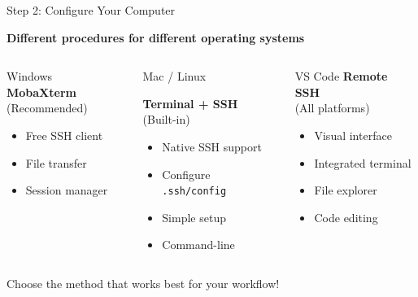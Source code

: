 \documentclass[aspectratio=169]{beamer}
\begin{document}
\begin{frame}{Step 2: Configure Your Computer}
\begin{center}
\Large \textcolor{ceciblue}{\textbf{Different procedures for different operating systems}}
\end{center}

\vspace{1em}
\begin{columns}[T]
\begin{block}{\centering Windows}
\centering
\vspace{0.5em}
\textbf{MobaXterm}\\
{\small (Recommended)}
\vspace{0.3em}
\begin{itemize}
    \item Free SSH client
    \item File transfer
    \item Session manager
\end{itemize}
\end{block}

\begin{block}{\centering Mac / Linux}
\centering

\vspace{0.5em}
\textbf{Terminal + SSH}\\
{\small (Built-in)}
\vspace{0.3em}
\begin{itemize}
    \item Native SSH support
    \item Configure \texttt{.ssh/config}
    \item Simple setup
    \item Command-line
\end{itemize}
\end{block}

\begin{block}{\centering VS Code}
\centering
\vspace{0.5em}
\textbf{Remote SSH}\\
{\small (All platforms)}
\vspace{0.3em}
\begin{itemize}
    \item Visual interface
    \item Integrated terminal
    \item File explorer
    \item Code editing
\end{itemize}
\end{block}
\end{columns}

\vspace{1em}
\centering
\textcolor{ceciblue}{Choose the method that works best for your workflow!}
\end{frame}
\end{document}
